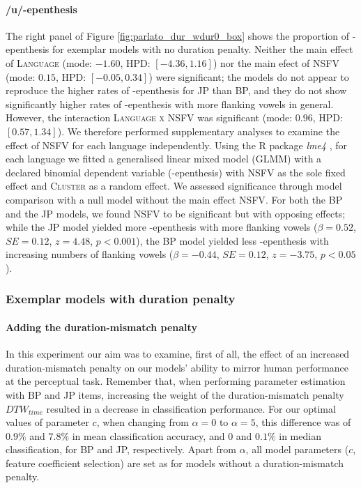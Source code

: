 \paragraph{/u/-epenthesis}
The right panel of Figure \ref{fig:parlato_dur_wdur0_box} shows the proportion of -epenthesis for exemplar models with no duration penalty.
Neither the main effect of \textsc{Language} (mode: $-1.60$, HPD: $[-4.36, 1.16]$) nor the main efect of \textsc{NSFV} (mode: $0.15$, HPD: $[-0.05, 0.34]$) were significant; the models do not appear to reproduce the higher rates of -epenthesis for JP than BP, and they do not show significantly higher rates of -epenthesis with more  flanking vowels in general. 
However, the interaction \textsc{Language x NSFV} was significant (mode: $0.96$, HPD: $[0.57, 1.34]$). We therefore performed supplementary analyses to examine the effect of NSFV for each language independently. Using the R package \textit{lme4} \cite{R-lme4}, for each language we fitted a generalised linear mixed model (GLMM) with a declared binomial dependent variable (-epenthesis) with \textsc{NSFV} as the sole fixed effect and \textsc{Cluster} as a random effect. We assessed significance through model comparison with a null model without the main effect \textsc{NSFV}. For both the BP and the JP models, we found \textsc{NSFV} to be significant but with opposing effects; while the JP model yielded more -epenthesis with more  flanking vowels ($\beta = 0.52$, $SE = 0.12$, $z = 4.48$, $p < 0.001$), the BP model yielded less -epenthesis with increasing numbers of  flanking vowels ($\beta = -0.44$, $SE = 0.12$, $z = -3.75$, $p < 0.05$).     

\subsubsection{Exemplar models with duration penalty}

\paragraph{Adding the duration-mismatch penalty}
In this experiment our aim was to examine, first of all, the effect of an increased duration-mismatch penalty on our models' ability to mirror human performance at the perceptual task. Remember that, when performing parameter estimation with BP and JP items, increasing the weight of the duration-mismatch penalty $DTW_{time}$ resulted in a decrease in classification performance. For our optimal values of parameter $c$, when changing from $\alpha = 0$ to $\alpha = 5$, this difference was of $0.9\%$ and $7.8\%$ in mean classification accuracy, and $0$ and $0.1\%$ in median classification, for BP and JP, respectively. Apart from $\alpha$, all model parameters ($c$, feature coefficient selection) are set as for models without a duration-mismatch penalty.    

